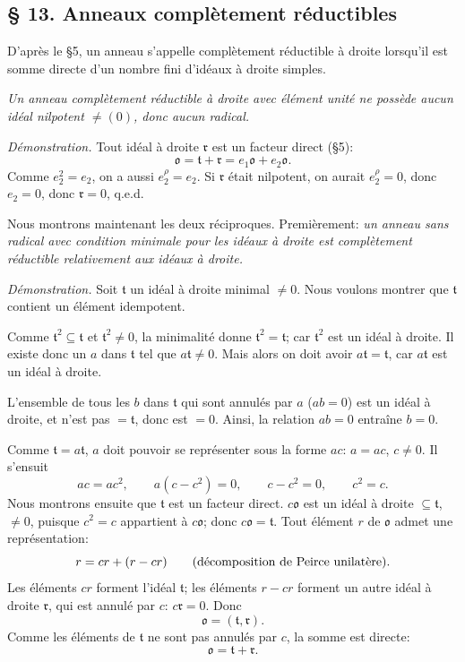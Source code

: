 
\providecommand{\mo}{\mathfrak{o}}
\providecommand{\ma}{\mathfrak{a}}
\providecommand{\mc}{\mathfrak{c}}
\providecommand{\md}{\mathfrak{d}}
\providecommand{\ml}{\mathfrak{l}}
\providecommand{\mr}{\mathfrak{r}}
\providecommand{\mt}{\mathfrak{t}}

\subsection*{\S{} 13. Anneaux complètement réductibles}

D'après le \S{}5, un anneau s'appelle complètement réductible à droite lorsqu'il est somme directe d'un nombre fini d'idéaux à droite simples.

\emph{Un anneau complètement réductible à droite avec élément unité ne possède aucun idéal nilpotent $\ne(0)$, donc aucun radical.}

\emph{Démonstration.} Tout idéal à droite $\mr$ est un facteur direct (\S{}5):
\[
        \mo=\mt+\mr=e_1\mo+e_2\mo.
\]
Comme $e_2^2=e_2$, on a aussi $e_2^\rho=e_2$. Si $\mr$ était nilpotent, on aurait $e_2^\rho=0$, donc $e_2=0$, donc $\mr=0$, q.e.d.

Nous montrons maintenant les deux réciproques. Premièrement: \emph{un anneau sans radical avec condition minimale pour les idéaux à droite est complètement réductible relativement aux idéaux à droite.}

\emph{Démonstration.} Soit $\mt$ un idéal à droite minimal $\ne0$. Nous voulons montrer que $\mt$ contient un élément idempotent.

Comme $\mt^2\subseteq\mt$ et $\mt^2\ne0$, la minimalité donne $\mt^2=\mt$; car $\mt^2$ est un idéal à droite. Il existe donc un $a$ dans $\mt$ tel que $a\mt\ne0$. Mais alors on doit avoir $a\mt=\mt$, car $a\mt$ est un idéal à droite.

L'ensemble de tous les $b$ dans $\mt$ qui sont annulés par $a$ ($ab=0$) est un idéal à droite, et n'est pas $=\mt$, donc est $=0$. Ainsi, la relation $ab=0$ entraîne $b=0$.

Comme $\mt=a\mt$, $a$ doit pouvoir se représenter sous la forme $ac$: $a=ac$, $c\ne0$. Il s'ensuit
\[
        ac=ac^2,
        \qquad a(c-c^2)=0,
        \qquad c-c^2=0,
        \qquad c^2=c.
\]
Nous montrons ensuite que $\mt$ est un facteur direct. $c\mo$ est un idéal à droite $\subseteq\mt$, $\ne0$, puisque $c^2=c$ appartient à $c\mo$; donc $c\mo=\mt$. Tout élément $r$ de $\mo$ admet une représentation:
\[
        r=cr+(r-cr) \qquad \hbox{(décomposition de Peirce unilatère).}
\]
Les éléments $cr$ forment l'idéal $\mt$; les éléments $r-cr$ forment un autre idéal à droite $\mr$, qui est annulé par $c$: $c\mr=0$. Donc
\[
        \mo=(\mt,\mr).
\]
Comme les éléments de $\mt$ ne sont pas annulés par $c$, la somme est directe:
\begin{equation}
        \mo=\mt+\mr.                                             \tag{1}
\end{equation}

